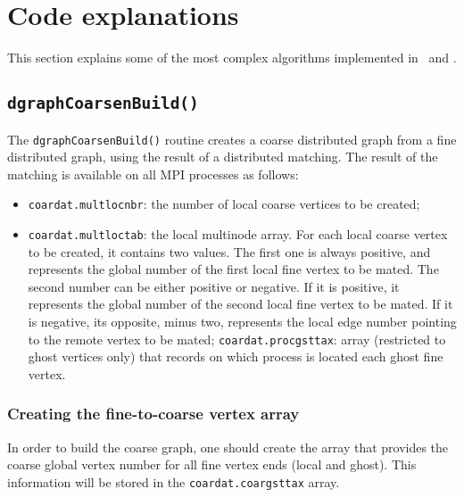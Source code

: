 
\section{Code explanations}
\label{sec-code}

This section explains some of the most complex algorithms implemented
in \scotch\ and \ptscotch.

\subsection{\texttt{dgraphCoarsenBuild()}}

The \texttt{dgraphCoarsenBuild()} routine creates a coarse distributed
graph from a fine distributed graph, using the result of a distributed
matching. The result of the matching is available on all MPI processes
as follows:
\begin{itemize}
\item
  \texttt{coardat.\lbt multlocnbr}: the number of local coarse
  vertices to be created;
\item
  \texttt{coardat.\lbt multloctab}: the local multinode array. For each
  local coarse vertex to be created, it contains two values. The first
  one is always positive, and represents the global number of the first
  local fine vertex to be mated. The second number can be either
  positive or negative. If it is positive, it represents the global
  number of the second local fine vertex to be mated. If it is
  negative, its opposite, minus two, represents the local edge number
  pointing to the remote vertex to be mated;
  \texttt{coardat.\lbt procgsttax}: array (restricted to ghost
  vertices only) that records on which process is located each ghost
  fine vertex.
\end{itemize}

\subsubsection{Creating the fine-to-coarse vertex array}

In order to build the coarse graph, one should create the array that
provides the coarse global vertex number for all fine vertex ends
(local and ghost). This information will be stored in the
\texttt{coardat.\lbt coargsttax} array.

